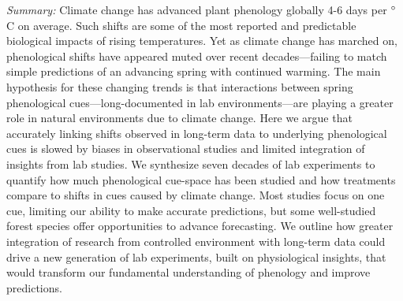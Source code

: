 \documentclass[11pt,letter]{article}
\newcommand{\R}[1]{\label{#1}\linelabel{#1}}
\begin{document}
\newpage
\emph{Summary:} 
Climate change has advanced plant phenology globally 4-6 days per $\degree$C on average. Such shifts are some of the most reported and predictable biological impacts of rising temperatures. Yet as climate change has marched on, phenological shifts have appeared muted over recent decades---failing to match simple predictions of an advancing spring with continued warming. The main hypothesis for these changing trends is that interactions between spring phenological cues---long-documented in lab environments---are playing a greater role in natural environments due to climate change. Here we argue that accurately linking shifts observed in long-term data to underlying phenological cues is slowed by biases in observational studies and limited integration of \R{absinsights} insights from lab studies. We synthesize seven decades of lab experiments to quantify how much phenological cue-space has been studied and how treatments compare to shifts in cues caused by climate change. Most studies focus on one cue, limiting our ability to make accurate predictions, but some well-studied forest species offer opportunities to advance forecasting. We outline how greater integration of research from controlled environment with long-term data could drive a new generation of lab experiments, \R{absmolec}built on physiological insights, that would transform our fundamental understanding of phenology and improve predictions. \\ %
\end{document}
